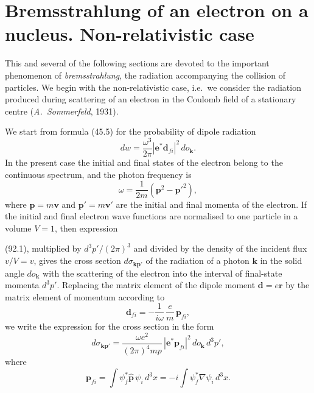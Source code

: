 
\section{Bremsstrahlung of an electron on a nucleus. Non-relativistic case}


This and several of the following sections are devoted to the important phenomenon of \emph{bremsstrahlung}, the radiation accompanying the collision of particles. We begin with the non-relativistic case, i.e.\ we consider the radiation produced during scattering of an electron in the Coulomb field of a stationary centre (\emph{A.~Sommerfeld}, 1931).

We start from formula (45.5) for the probability of dipole radiation
\begin{equation}
dw = \frac{\omega^3}{2\pi}|\mathbf{e}^*\mathbf{d}_{fi}|^2\,do_\mathbf{k}.
\label{eq:92.1}
\end{equation}
In the present case the initial and final states of the electron belong to the continuous spectrum, and the photon frequency is
\begin{equation}
\omega = \frac{1}{2m}(\mathbf{p}^2 - \mathbf{p}'^2),
\label{eq:92.2}
\end{equation}
where $\mathbf{p} = m\mathbf{v}$ and $\mathbf{p}' = m\mathbf{v}'$ are the initial and final momenta of the electron. If the initial and final electron wave functions are normalised to one particle in a volume $V = 1$, then expression


(92.1), multiplied by $d^3p'/(2\pi)^3$ and divided by the density of the incident flux $v/V = v$, gives the cross section $d\sigma_{\mathbf{kp}'}$ of the radiation of a photon $\mathbf{k}$ in the solid angle $do_\mathbf{k}$ with the scattering of the electron into the interval of final-state momenta $d^3p'$. Replacing the matrix element of the dipole moment $\mathbf{d} = e\mathbf{r}$ by the matrix element of momentum according to
\[
\mathbf{d}_{fi} = -\frac{1}{i\omega}\,\frac{e}{m}\,\mathbf{p}_{fi},
\]
we write the expression for the cross section in the form
\begin{equation}
d\sigma_{\mathbf{kp}'} = \frac{\omega e^2}{(2\pi)^4 mp}\,|\mathbf{e}^*\mathbf{p}_{fi}|^2\,do_\mathbf{k}\,d^3p',
\label{eq:92.3}
\end{equation}
where
\begin{equation}
\mathbf{p}_{fi} = \int \psi_f^*\hat{\mathbf{p}}\,\psi_i\,d^3x = -i\int\psi_f^*\nabla\psi_i\,d^3x.
\label{eq:92.4}
\end{equation}

